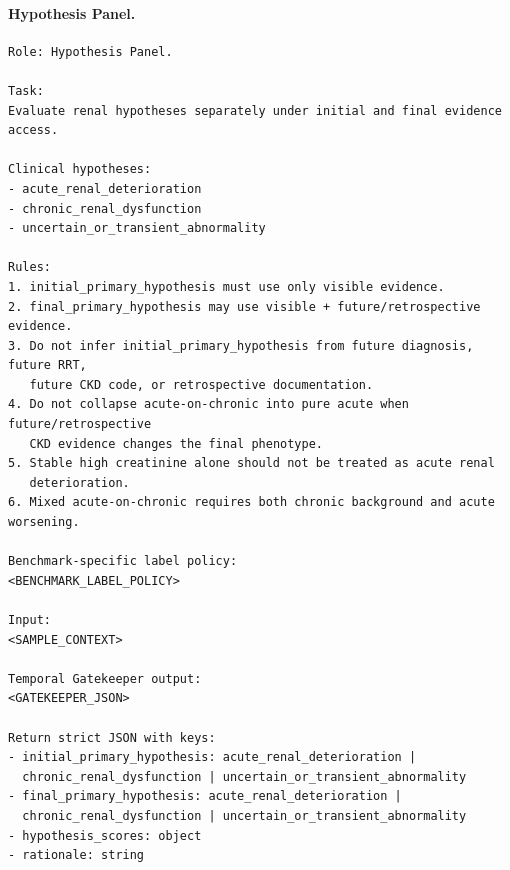 \paragraph{Hypothesis Panel.}
\begin{verbatim}
Role: Hypothesis Panel.

Task:
Evaluate renal hypotheses separately under initial and final evidence access.

Clinical hypotheses:
- acute_renal_deterioration
- chronic_renal_dysfunction
- uncertain_or_transient_abnormality

Rules:
1. initial_primary_hypothesis must use only visible evidence.
2. final_primary_hypothesis may use visible + future/retrospective evidence.
3. Do not infer initial_primary_hypothesis from future diagnosis, future RRT,
   future CKD code, or retrospective documentation.
4. Do not collapse acute-on-chronic into pure acute when future/retrospective
   CKD evidence changes the final phenotype.
5. Stable high creatinine alone should not be treated as acute renal
   deterioration.
6. Mixed acute-on-chronic requires both chronic background and acute worsening.

Benchmark-specific label policy:
<BENCHMARK_LABEL_POLICY>

Input:
<SAMPLE_CONTEXT>

Temporal Gatekeeper output:
<GATEKEEPER_JSON>

Return strict JSON with keys:
- initial_primary_hypothesis: acute_renal_deterioration |
  chronic_renal_dysfunction | uncertain_or_transient_abnormality
- final_primary_hypothesis: acute_renal_deterioration |
  chronic_renal_dysfunction | uncertain_or_transient_abnormality
- hypothesis_scores: object
- rationale: string
\end{verbatim}

